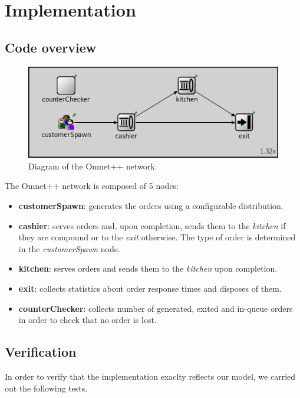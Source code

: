 \section{Implementation}

\subsection{Code overview}

\begin{figure}[h!]
    \centering
    \includegraphics[width=.75\textwidth]{figs/omnet_network.png}
    \caption{Diagram of the Omnet++ network.}
    \label{fig:omnet_network}
\end{figure}

The Omnet++ network is composed of 5 nodes:
\begin{itemize}
    \item \textbf{customerSpawn}: generates the orders using a configurable
        distribution.
    \item \textbf{cashier}: serves orders and, upon completion, sends them to 
        the \emph{kitchen} if they are compound or to the \emph{exit} otherwise.
        The type of order is determined in the \emph{customerSpawn} node.
    \item \textbf{kitchen}: serves orders and sends them to the \emph{kitchen}
        upon completion.
    \item \textbf{exit}: collects statistics about order response times and 
        disposes of them.
    \item \textbf{counterChecker}: collects number of generated, exited and 
        in-queue orders in order to check that no order is lost.
\end{itemize}


\subsection{Verification}
In order to verify that the implementation exaclty reflects our model, we 
carried out the following tests.

